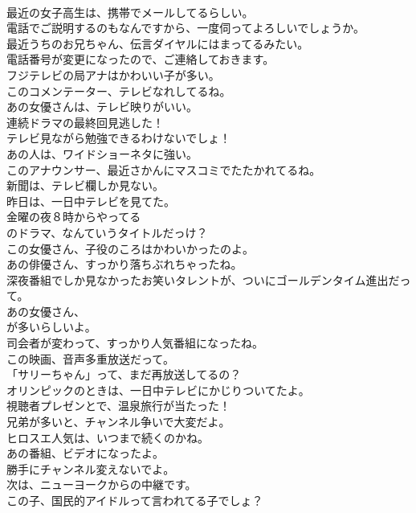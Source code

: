 \documentclass[8pt]{extreport}
\begin{document}
\begin{CJK}{UTF8}{min}
\\	最近の女子高生は、携帯でメールしてるらしい。	
\\	電話でご説明するのもなんですから、一度伺ってよろしいでしょうか。	
\\	最近うちのお兄ちゃん、伝言ダイヤルにはまってるみたい。	
\\	電話番号が変更になったので、ご連絡しておきます。	
\\	フジテレビの局アナはかわいい子が多い。	
\\	このコメンテーター、テレビなれしてるね。	
\\	あの女優さんは、テレビ映りがいい。	
\\	連続ドラマの最終回見逃した！	
\\	テレビ見ながら勉強できるわけないでしょ！	
\\	あの人は、ワイドショーネタに強い。	
\\	このアナウンサー、最近さかんにマスコミでたたかれてるね。	
\\	新聞は、テレビ欄しか見ない。	
\\	昨日は、一日中テレビを見てた。	
\\	金曜の夜８時からやってる
\\	のドラマ、なんていうタイトルだっけ？	
\\	この女優さん、子役のころはかわいかったのよ。	
\\	あの俳優さん、すっかり落ちぶれちゃったね。	
\\	深夜番組でしか見なかったお笑いタレントが、ついにゴールデンタイム進出だって。	
\\	あの女優さん、
\\	が多いらしいよ。	
\\	司会者が変わって、すっかり人気番組になったね。	
\\	この映画、音声多重放送だって。	
\\	「サリーちゃん」って、まだ再放送してるの？	
\\	オリンピックのときは、一日中テレビにかじりついてたよ。	
\\	視聴者プレゼンとで、温泉旅行が当たった！	
\\	兄弟が多いと、チャンネル争いで大変だよ。	
\\	ヒロスエ人気は、いつまで続くのかね。	
\\	あの番組、ビデオになったよ。	
\\	勝手にチャンネル変えないでよ。	
\\	次は、ニューヨークからの中継です。	
\\	この子、国民的アイドルって言われてる子でしょ？	

\end{CJK}
\end{document}
